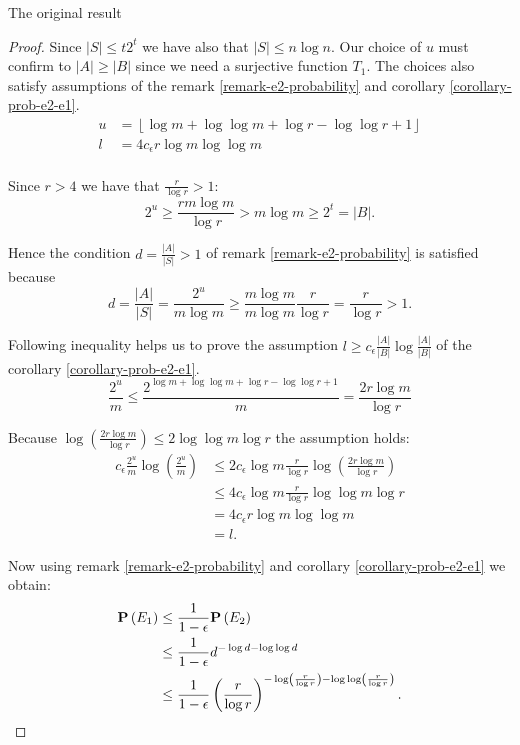 \begin{section}{The original result}
\begin{proof}
Since $|S| \leq t 2 ^ t$ we have also that $|S| \leq n \log n$. Our choice of $u$ must confirm to $|A| \geq |B|$ since we need a surjective function $T_1$. The choices also satisfy assumptions of the remark \ref{remark-e2-probability} and corollary \ref{corollary-prob-e2-e1}.
\[
\begin{split}
	u & = \left\lfloor \log m + \log \log m + \log r - \log \log r + 1 \right\rfloor \\
	l & = 4c_{\epsilon}r\log m \log \log m \\
\end{split}
\]

Since $r > 4$ we have that $\frac{r}{\log r} > 1$:
\[
	2 ^ u \geq \frac{rm \log m}{\log r} > m \log m \geq 2 ^ t = |B| \text{.}
\]

Hence the condition $d = \frac{|A|}{|S|} > 1$ of remark \ref{remark-e2-probability} is satisfied because
\[
	d = \frac{|A|}{|S|} = \frac{2^u}{m \log m} \geq \frac{m \log m}{m \log m}\frac{r}{\log r} = \frac{r}{\log r} > 1 \text{.}
\]

Following inequality helps us to prove the assumption $l \geq c_\epsilon \frac{|A|}{|B|} \log \frac{|A|}{|B|}$ of the corollary \ref{corollary-prob-e2-e1}.
\[
	\frac{2^u}{m} \leq \frac{2 ^{\log m + \log \log m + \log r - \log \log r + 1}}{m} = \frac{2 r\log m}{\log r}
\]

Because $\log \left(\frac{2 r\log m}{\log r}\right) \leq 2 \log \log m \log r$ the assumption holds:
\[
\begin{split}
c_{\epsilon}\frac{2^u}{m}\log\left(\frac{2^u}{m}\right)
	& \leq 2 c_{\epsilon} \log m \frac{r}{\log r} \log \left(\frac{2 r\log m}{\log r}\right) \\
	& \leq 4 c_{\epsilon} \log m \frac{r}{\log r} \log \log m \log r \\
	& = 4 c_{\epsilon} r \log m \log \log m \\
	& = l \text{.}
\end{split}
\]

Now using remark \ref{remark-e2-probability} and corollary \ref{corollary-prob-e2-e1} we obtain:
\[
\begin{split}
\mathbf{P}\left(E_1\right)
	& \leq \frac{1}{1 - \epsilon} \mathbf{P}\left(E_2\right) \\
	& \leq \frac{1}{1 - \epsilon} d ^ {-\log d - \log \log d} \\ 
	& \leq \frac{1}{1 - \epsilon} \left(\frac{r}{\log r}\right)^{-\log \left(\frac{r}{\log r}\right) - \log \log \left(\frac{r}{\log r}\right)} \text{.}
\end{split}
\]


\end{proof}
\end{section}
